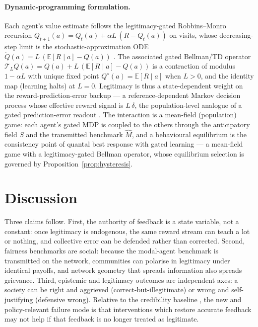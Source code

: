 \documentclass[11pt]{article}
\newcommand{\E}{\mathbb{E}}
\newcommand{\1}{\mathbf{1}}
\begin{document}
\paragraph{Dynamic-programming formulation.}
Each agent's value estimate follows the legitimacy-gated Robbins--Monro recursion
$Q_{t+1}(a)=Q_t(a)+\alpha L\,(R-Q_t(a))$ on visits, whose decreasing-step limit is
the stochastic-approximation ODE $\dot Q(a)=L\,(\E[R\mid a]-Q(a))$
\citep{Borkar2008}. The associated gated Bellman/TD operator
$\mathcal T_L Q(a)=Q(a)+L\,(\E[R\mid a]-Q(a))$ is a contraction of modulus
$1-\alpha L$ with unique fixed point $Q^\star(a)=\E[R\mid a]$ when $L>0$, and the
identity map (learning halts) at $L=0$. Legitimacy is thus a state-dependent
weight on the reward-prediction-error backup --- a reference-dependent Markov
decision process whose effective reward signal is $L\,\delta$, the population-level
analogue of a gated prediction-error readout
\citep{JoinerPivaTurrinChang2017}. The interaction is a mean-field (population)
game: each agent's gated MDP is coupled to the others through the anticipatory
field $S$ and the transmitted benchmark $\hat M$, and a behavioural equilibrium is
the consistency point of quantal best response with gated learning --- a
mean-field game with a legitimacy-gated Bellman operator, whose equilibrium
selection is governed by Proposition~\ref{prop:hysteresis}.

\section{Discussion}
\label{sec:discussion}
Three claims follow. First, the authority of feedback is a state variable, not a
constant: once legitimacy is endogenous, the same reward stream can teach a lot or
nothing, and collective error can be defended rather than corrected. Second,
fairness benchmarks are social: because the modal-agent benchmark is transmitted
on the network, communities can polarise in legitimacy under identical payoffs,
and network geometry that spreads information also spreads grievance. Third,
epistemic and legitimacy outcomes are independent axes: a society can be right and
aggrieved (correct-but-illegitimate) or wrong and self-justifying (defensive
wrong). Relative to the credibility baseline \citep{BontempsBanerjee2026}, the new
and policy-relevant failure mode is that interventions which restore accurate
feedback may not help if that feedback is no longer treated as legitimate.
\end{document}
